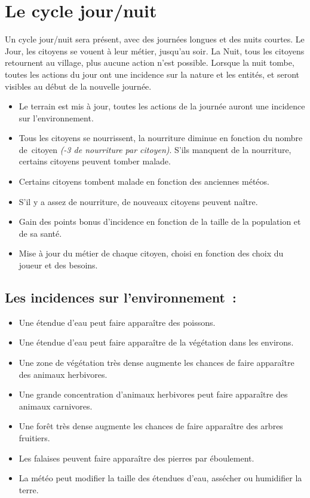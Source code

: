 \documentclass[a4paper]{article}
\begin{document}
    \section{Le cycle jour/nuit}
      Un cycle jour/nuit sera présent, avec des journées longues et des nuits courtes. Le Jour, les citoyens se vouent à leur métier, jusqu'au soir. La Nuit, tous les citoyens retournent au village, plus aucune action n'est possible. Lorsque la nuit tombe, toutes les actions du jour ont une incidence sur la nature et les entités, et seront visibles au début de la nouvelle journée.
      \begin{itemize} \small
        \item Le terrain est mis à jour, toutes les actions de la journée auront une incidence sur l'environnement.
        \item Tous les citoyens se nourrissent, la nourriture diminue en fonction du nombre de citoyen \textit{(-3 de nourriture par citoyen)}. S'ils manquent de la nourriture, certains citoyens peuvent tomber malade.
        \item Certains citoyens tombent malade en fonction des anciennes météos.
        \item S'il y a assez de nourriture, de nouveaux citoyens peuvent naître.
        \item Gain des points bonus d'incidence en fonction de la taille de la population et de sa santé.
        \item Mise à jour du métier de chaque citoyen, choisi en fonction des choix du joueur et des besoins.
      \end{itemize} \normalsize

      \subsection{Les incidences sur l'environnement :}
        \begin{itemize} \small
          \item Une étendue d'eau peut faire apparaître des poissons.
          \item Une étendue d'eau peut faire apparaître de la végétation dans les environs.
          \item Une zone de végétation très dense augmente les chances de faire apparaître des animaux herbivores.
          \item Une grande concentration d'animaux herbivores peut faire apparaître des animaux carnivores.
          \item Une forêt très dense augmente les chances de faire apparaître des arbres fruitiers.
          \item Les falaises peuvent faire apparaître des pierres par éboulement.
          \item La météo peut modifier la taille des étendues d'eau, assécher ou humidifier la terre.
        \end{itemize} \normalsize
\end{document}
